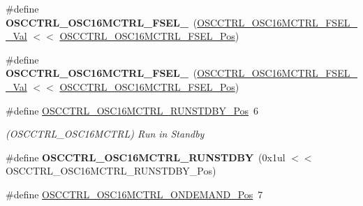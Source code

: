 \begin{DoxyCompactItemize}
\item 
\hypertarget{group___s_a_m_l21___o_s_c_c_t_r_l_ga4c1b93ffbcd9583b225d1b1434b4ee01}{}\#define {\bfseries O\+S\+C\+C\+T\+R\+L\+\_\+\+O\+S\+C16\+M\+C\+T\+R\+L\+\_\+\+F\+S\+E\+L\+\_}~(\hyperlink{group___s_a_m_l21___o_s_c_c_t_r_l_ga9097e04b6992fd931c676431881a23a0}{O\+S\+C\+C\+T\+R\+L\+\_\+\+O\+S\+C16\+M\+C\+T\+R\+L\+\_\+\+F\+S\+E\+L\+\_\+\_\+\+Val} $<$$<$ \hyperlink{group___s_a_m_l21___o_s_c_c_t_r_l_gab65dca33592ddda96df4de27654a4869}{O\+S\+C\+C\+T\+R\+L\+\_\+\+O\+S\+C16\+M\+C\+T\+R\+L\+\_\+\+F\+S\+E\+L\+\_\+\+Pos})\label{group___s_a_m_l21___o_s_c_c_t_r_l_ga4c1b93ffbcd9583b225d1b1434b4ee01}

\item 
\hypertarget{group___s_a_m_l21___o_s_c_c_t_r_l_gac33387e098fa70fb2fd7d05e4a21c516}{}\#define {\bfseries O\+S\+C\+C\+T\+R\+L\+\_\+\+O\+S\+C16\+M\+C\+T\+R\+L\+\_\+\+F\+S\+E\+L\+\_}~(\hyperlink{group___s_a_m_l21___o_s_c_c_t_r_l_gace6ca7bbfea5731200a559cb2c9814e2}{O\+S\+C\+C\+T\+R\+L\+\_\+\+O\+S\+C16\+M\+C\+T\+R\+L\+\_\+\+F\+S\+E\+L\+\_\+\_\+\+Val} $<$$<$ \hyperlink{group___s_a_m_l21___o_s_c_c_t_r_l_gab65dca33592ddda96df4de27654a4869}{O\+S\+C\+C\+T\+R\+L\+\_\+\+O\+S\+C16\+M\+C\+T\+R\+L\+\_\+\+F\+S\+E\+L\+\_\+\+Pos})\label{group___s_a_m_l21___o_s_c_c_t_r_l_gac33387e098fa70fb2fd7d05e4a21c516}

\item 
\hypertarget{group___s_a_m_l21___o_s_c_c_t_r_l_ga197309f2dcb686eb9e4137c601272a22}{}\#define \hyperlink{group___s_a_m_l21___o_s_c_c_t_r_l_ga197309f2dcb686eb9e4137c601272a22}{O\+S\+C\+C\+T\+R\+L\+\_\+\+O\+S\+C16\+M\+C\+T\+R\+L\+\_\+\+R\+U\+N\+S\+T\+D\+B\+Y\+\_\+\+Pos}~6\label{group___s_a_m_l21___o_s_c_c_t_r_l_ga197309f2dcb686eb9e4137c601272a22}

\begin{DoxyCompactList}\small\item\em (O\+S\+C\+C\+T\+R\+L\+\_\+\+O\+S\+C16\+M\+C\+T\+R\+L) Run in Standby \end{DoxyCompactList}\item 
\hypertarget{group___s_a_m_l21___o_s_c_c_t_r_l_ga67b461cccf1830e1c7a8270879098278}{}\#define {\bfseries O\+S\+C\+C\+T\+R\+L\+\_\+\+O\+S\+C16\+M\+C\+T\+R\+L\+\_\+\+R\+U\+N\+S\+T\+D\+B\+Y}~(0x1ul $<$$<$ O\+S\+C\+C\+T\+R\+L\+\_\+\+O\+S\+C16\+M\+C\+T\+R\+L\+\_\+\+R\+U\+N\+S\+T\+D\+B\+Y\+\_\+\+Pos)\label{group___s_a_m_l21___o_s_c_c_t_r_l_ga67b461cccf1830e1c7a8270879098278}

\item 
\hypertarget{group___s_a_m_l21___o_s_c_c_t_r_l_ga168c07c8ed683daca390eaecd7151e7b}{}\#define \hyperlink{group___s_a_m_l21___o_s_c_c_t_r_l_ga168c07c8ed683daca390eaecd7151e7b}{O\+S\+C\+C\+T\+R\+L\+\_\+\+O\+S\+C16\+M\+C\+T\+R\+L\+\_\+\+O\+N\+D\+E\+M\+A\+N\+D\+\_\+\+Pos}~7\label{group___s_a_m_l21___o_s_c_c_t_r_l_ga168c07c8ed683daca390eaecd7151e7b}


\end{DoxyCompactItemize}
